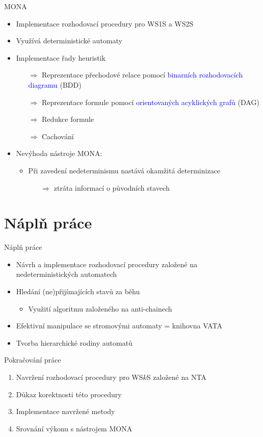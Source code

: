 \documentclass{beamer}
\begin{document}
	\begin{frame}{MONA}
	 \begin{itemize}
	  \item Implementace rozhodovací procedury pro WS1S a WS2S
	  \item Využívá deterministické automaty
	  \item Implementace řady heuristik
	  \begin{itemize}
	   \pause
	    \item[$\Rightarrow$] Reprezentace přechodové relace pomocí
	    \textcolor{blue}{binarních rozhodovacích diagramu} (BDD)
	   \pause
	    \item[$\Rightarrow$] Reprezentace formule pomocí
	    \textcolor{blue}{orientovaných acyklických grafů} (DAG)
	   \pause
	    \item[$\Rightarrow$] Redukce formule
	   \pause
	    \item[$\Rightarrow$] Cachování 
	  \end{itemize}
	   \pause
	   \item Nevýhoda nástroje MONA:
	   \begin{itemize}
	  \item Při zavedení nedeterminismu nastává okamžitá determinizace
	  \begin{itemize}
	    \pause
	    \item[$\Rightarrow$] ztráta informací o původních stavech
	  \end{itemize}
	  \end{itemize}
	 \end{itemize}
	\end{frame}
	
	\section{Náplň práce}
	\begin{frame}{Náplň práce}
	 \begin{itemize}
	   \item Návrh a implementace rozhodovací procedury založené na
	   nedeterministických automatech
	   \pause
	   \item Hledání (ne)přijímajících stavů za běhu
	   \begin{itemize}
	     \item Využití algoritmu založeného na anti-chainech
	   \pause
	   \end{itemize}
	   \item Efektivní manipulace se stromovými automaty = knihovna VATA
	   \pause
	   \item Tvorba hierarchické rodiny automatů
	 \end{itemize}
	\end{frame}
	
    \begin{frame}{Pokračování práce}
    \begin{enumerate}
      \item Navržení rozhodovací procedury pro WS$k$S založené na NTA
      \item Důkaz korektnosti této procedury
      \item Implementace navržené metody
      \item Srovnání výkonu s nástrojem MONA
    \end{enumerate}
  \end{frame}
\end{document}
